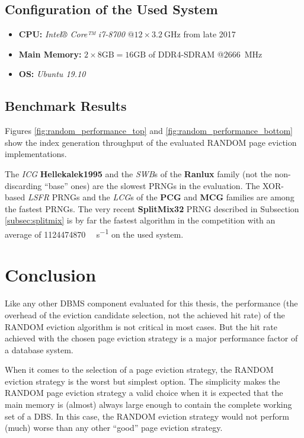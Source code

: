 \subsection[System Configuration]{Configuration of the Used System}

\begin{@empty}
    \begin{itemize}
        \itemsep0em
		\item	\textbf{CPU:} \emph{Intel® Core™ i7-8700} @$12 \times \SI{3.2}{\giga\hertz}$ from late 2017
        \item	\textbf{Main Memory:} $2 \times 8\text{GB} = 16\text{GB}$ of DDR4-SDRAM @\SI{2666}{\mega\hertz}
        \item	\textbf{OS:} \emph{Ubuntu 19.10}
    \end{itemize}
\end{@empty}

\subsection[Benchmark Results]{Benchmark Results}

    Figures \ref{fig:random_performance_top} and \ref{fig:random_performance_bottom} show the index generation throughput of the evaluated RANDOM page eviction implementations.

    The \emph{ICG} \textbf{Hellekalek1995} and the \emph{SWB}s of the \textbf{Ranlux} family (not the non-discarding ``base'' ones) are the slowest PRNGs in the evaluation. The XOR-based \emph{LSFR} PRNGs and the \emph{LCG}s of the \textbf{PCG} and \textbf{MCG} families are among the fastest PRNGs. The very recent \textbf{SplitMix32} PRNG described in Subsection \ref{subsec:splitmix} is by far the fastest algorithm in the competition with an average of \SI{1124474870
    }{\indexes\per\second} on the used system.

\section{Conclusion}

    Like any other DBMS component evaluated for this thesis, the performance (the overhead of the eviction candidate selection, not the achieved hit rate) of the RANDOM eviction algorithm is not critical in most cases. But the hit rate achieved with the chosen page eviction strategy is a major performance factor of a database system.

    When it comes to the selection of a page eviction strategy, the RANDOM eviction strategy is the worst but simplest option. The simplicity makes the RANDOM page eviction strategy a valid choice when it is expected that the main memory is (almost) always large enough to contain the complete working set of a DBS. In this case, the RANDOM eviction strategy would not perform (much) worse than any other ``good'' page eviction strategy.

